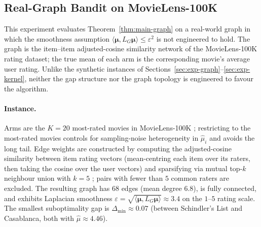 
\subsection{Real-Graph Bandit on MovieLens-100K}\label{sec:exp-real}

This experiment evaluates Theorem~\ref{thm:main-graph} on a real-world graph in which the smoothness assumption $\langle\bm{\mu},L_G\bm{\mu}\rangle\le\varepsilon^2$ is not engineered to hold. The graph is the item--item adjusted-cosine similarity network of the MovieLens-100K rating dataset; the true mean of each arm is the corresponding movie's average user rating. Unlike the synthetic instances of Sections~\ref{sec:exp-graph}--\ref{sec:exp-kernel}, neither the gap structure nor the graph topology is engineered to favour the algorithm.

\paragraph{Instance.}
Arms are the $K=20$ most-rated movies in MovieLens-100K \citep{harper2015movielens}; restricting to the most-rated movies controls for sampling-noise heterogeneity in $\widehat\mu_i$ and avoids the long tail. Edge weights are constructed by computing the adjusted-cosine similarity between item rating vectors (mean-centring each item over its raters, then taking the cosine over the user vectors) and sparsifying via mutual top-$k$ neighbour union with $k=5$ \citep{sarwar2001item}; pairs with fewer than $5$ common raters are excluded. The resulting graph has $68$ edges (mean degree $6.8$), is fully connected, and exhibits Laplacian smoothness $\varepsilon=\sqrt{\langle\bm{\mu},L_G\bm{\mu}\rangle}\approx 3.4$ on the $1$--$5$ rating scale. The smallest suboptimality gap is $\Delta_{\min}\approx 0.07$ (between Schindler's List and Casablanca, both with $\widehat\mu\approx 4.46$).

